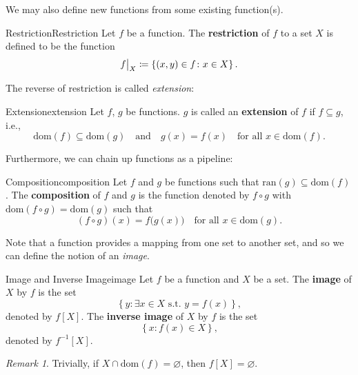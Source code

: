 \documentclass[math]{amznotes}
\theoremstyle{remark}
\newtheorem*{remark}{Remark}
\begin{document}
We may also define new functions from some existing function(s).
\begin{dfnbox}{Restriction}{Restriction}
    Let $f$ be a function. The {\color{red} \textbf{restriction}} of $f$ to a set $X$ is defined to be the function  
    \begin{displaymath}
        \restrict{f}{X} \coloneqq \left\{(x, y) \in f \colon x \in X\right\}.
    \end{displaymath}
\end{dfnbox}
The reverse of restriction is called \textit{extension}:
\begin{dfnbox}{Extension}{extension}
    Let $f$, $g$ be functions. $g$ is called an {\color{red} \textbf{extension}} of $f$ if $f \subseteq g$, i.e.,
    \begin{displaymath}
        \mathrm{dom}(f) \subseteq \mathrm{dom}(g) \quad \textrm{and} \quad g(x) = f(x) \quad \textrm{for all } x \in \mathrm{dom}(f).
    \end{displaymath}
\end{dfnbox}
Furthermore, we can chain up functions as a pipeline:
\begin{dfnbox}{Composition}{composition}
    Let $f$ and $g$ be functions such that $\mathrm{ran}(g) \subseteq \mathrm{dom}(f)$. The {\color{red} \textbf{composition}} of $f$ and $g$ is the function denoted by $f \circ g$ with $\mathrm{dom}(f \circ g) = \mathrm{dom}(g)$ such that
    \begin{displaymath}
        (f \circ g)(x) = f\bigl(g(x)\bigr) \quad \textrm{for all } x \in \mathrm{dom}(g).
    \end{displaymath}
\end{dfnbox}
Note that a function provides a mapping from one set to another set, and so we can define the notion of an \textit{image}.
\begin{dfnbox}{Image and Inverse Image}{image}
    Let $f$ be a function and $X$ be a set. The {\color{red} \textbf{image}} of $X$ by $f$ is the set
    \begin{displaymath}
        \left\{y \colon \exists x \in X \textrm{ s.t. } y = f(x)\right\},
    \end{displaymath}
    denoted by $f[X]$. The {\color{red} \textbf{inverse image}} of $X$ by $f$ is the set
    \begin{displaymath}
        \left\{x \colon f(x) \in X\right\},
    \end{displaymath}
    denoted by $f^{-1}[X]$.
\end{dfnbox}
\begin{notebox}
    \begin{remark}
        Trivially, if $X \cap \mathrm{dom}(f) = \varnothing$, then $f[X] = \varnothing$.
    \end{remark}
\end{notebox}
\end{document}
